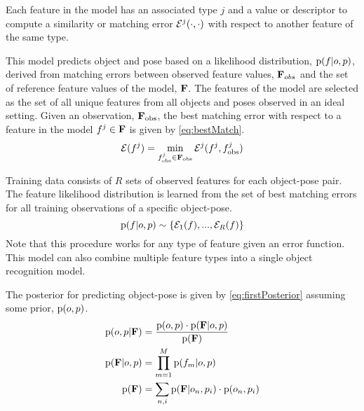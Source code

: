             Each feature in the model has an associated type $j$ and a value or descriptor to compute a similarity or matching error $\mathcal{E}^j(\cdot,\cdot)$ with respect to another feature of the same type.

            This model predicts object and pose based on a likelihood distribution, $\text{p}(f|o,p)$, derived from matching errors between observed feature values, $\mathbf{F}_{obs}$ and the set of reference feature values of the model, $\mathbf{F}$. The features of the model are selected as the set of all unique features from all objects and poses observed in an ideal setting. Given an observation, $\mathbf{F}_{\text{obs}}$, the best matching error with respect to a feature in the model $f^j \in \mathbf{F}$ is given by \eqref{eq:bestMatch}.
            \begin{equation}
                \label{eq:bestMatch}
                \mathcal{E}(f^j) = \min_{f^j_{\text{obs}} \in \mathbf{F}_{\text{obs}}}\mathcal{E}^j(f^j,f^j_{\text{obs}})
            \end{equation}
            
            Training data consists of $R$ sets of observed features for each object-pose pair. The feature likelihood distribution is learned from the set of best matching errors for all training observations of a specific object-pose.
            \begin{equation}
                \text{p}(f|o,p) \sim \{\mathcal{E}_1(f), ...,  \mathcal{E}_R(f)\}
            \end{equation}
            Note that this procedure works for any type of feature given an error function. This model can also combine multiple feature types into a single object recognition model. 
            
            The posterior for predicting object-pose is given by \eqref{eq:firstPosterior} assuming some prior, $\text{p}(o,p)$.
            \begin{align}
                \label{eq:firstPosterior}
                \text{p}(o,p|\mathbf{F}) &= \frac{\text{p}(o,p) \cdot \text{p}(\mathbf{F}|o,p)}{\text{p}(\mathbf{F})}\\
                \label{eq:setFeatureLikelihood}
                \text{p}(\mathbf{F}|o,p) &= \prod_{m=1}^{M} \text{p}(f_m|o,p)\\
                \label{eq:setFeatureEvidence}
                \text{p}(\mathbf{F}) &= \sum_{n,i} \text{p}(\mathbf{F}|o_n,p_i)\cdot \text{p}(o_n,p_i)
            \end{align}

